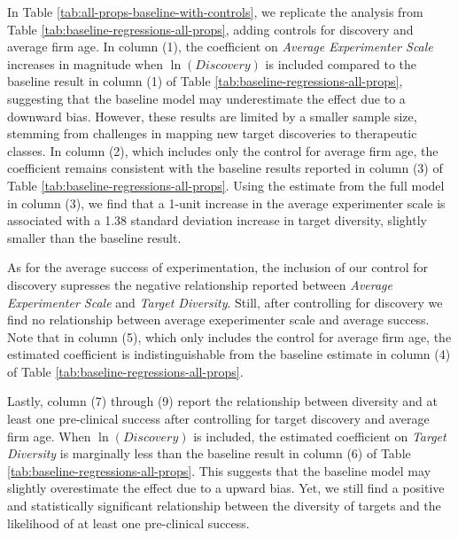 In Table \ref{tab:all-props-baseline-with-controls}, we replicate the analysis from Table \ref{tab:baseline-regressions-all-props}, adding controls for discovery and average firm age. In column (1), the coefficient on \emph{Average Experimenter Scale} increases in magnitude when $\ln(Discovery)$ is included compared to the baseline result in column (1) of Table \ref{tab:baseline-regressions-all-props}, suggesting that the baseline model may underestimate the effect due to a downward bias. However, these results are limited by a smaller sample size, stemming from challenges in mapping new target discoveries to therapeutic classes. In column (2), which includes only the control for average firm age, the coefficient remains consistent with the baseline results reported in column (3) of Table \ref{tab:baseline-regressions-all-props}. Using the estimate from the full model in column (3), we find that a 1-unit increase in the average experimenter scale is associated with a 1.38 standard deviation increase in target diversity, slightly smaller than the baseline result.

As for the average success of experimentation, the inclusion of our control for discovery supresses the negative relationship reported between \emph{Average Experimenter Scale} and \emph{Target Diversity}. Still, after controlling for discovery we find no relationship between average exeperimenter scale and average success. Note that in column (5), which only includes the control for average firm age, the estimated coefficient is indistinguishable from the baseline estimate in column (4) of Table \ref{tab:baseline-regressions-all-props}.

Lastly, column (7) through (9) report the relationship between diversity and at least one pre-clinical success after controlling for target discovery and average firm age. When $\ln(Discovery)$ is included, the estimated coefficient on \emph{Target Diversity} is marginally less than the baseline result in column (6) of Table \ref{tab:baseline-regressions-all-props}. This suggests that the baseline model may slightly overestimate the effect due to a upward bias. Yet, we still find a positive and statistically significant relationship between the diversity of targets and the likelihood of at least one pre-clinical success.


